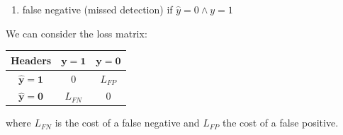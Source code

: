 \begin{itemize}
\begin{enumerate}
            \item {false negative} (missed detection) if $\hat{y}=0 \wedge y=1$
        \end{enumerate}
        We can consider the loss matrix:\\
        \begin{tabular}{|*{3}{c|}}
            \hline
            \textbf{Headers} & $\bm{y=1}$ & $\bm{y=0}$\\
            \hline
            $\bm{\hat{y}=1}$ & 0 & $L_{FP}$\\
            \hline
            $\bm{\hat{y}=0}$ & $L_{FN}$ & 0\\
            \hline
        \end{tabular}
        where $L_{FN}$ is the cost of a false negative and $L_{FP}$ the cost of a false
        positive.


\end{itemize}
